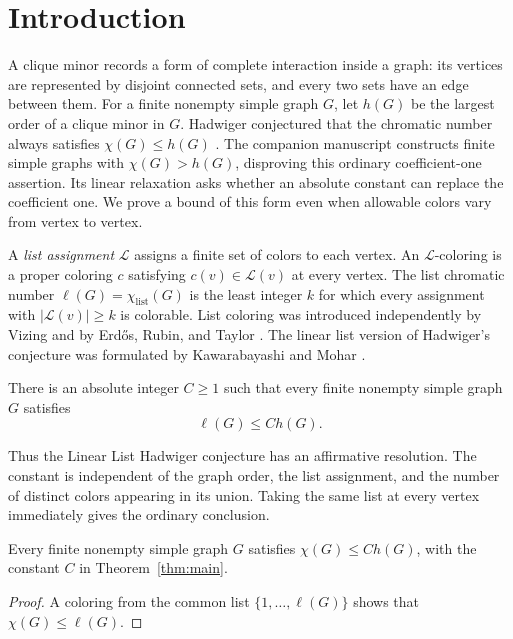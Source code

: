 \section{Introduction}\label{sec:introduction}

A clique minor records a form of complete interaction inside a graph:
its vertices are represented by disjoint connected sets, and every two
sets have an edge between them. For a finite nonempty simple graph $G$,
let $h(G)$ be the largest order of a clique minor in $G$. Hadwiger
conjectured that the chromatic number always satisfies
$\chi(G)\le h(G)$ \cite{Hadwiger1943}. The companion manuscript
\cite[Corollary~1.2]{OpenAIHadwigerCounterexample2026} constructs finite
simple graphs with $\chi(G)>h(G)$, disproving this ordinary coefficient-one
assertion. Its linear relaxation asks whether
an absolute constant can replace the coefficient one. We prove a bound
of this form even when allowable colors vary from vertex to vertex.

A \emph{list assignment} $\mathcal L$ assigns a finite set of colors to
each vertex. An $\mathcal L$-coloring is a proper coloring $c$ satisfying
$c(v)\in\mathcal L(v)$ at every vertex. The list chromatic number
$\ell(G)=\chi_{\mathrm{list}}(G)$ is the least integer $k$ for which every
assignment with $|\mathcal L(v)|\ge k$ is colorable. List coloring was
introduced independently by Vizing \cite{Vizing1976} and by Erd\H{o}s,
Rubin, and Taylor \cite{ErdosRubinTaylor1980}. The linear list
version of Hadwiger's conjecture was formulated by Kawarabayashi and
Mohar \cite[Conjecture~1.3]{KawarabayashiMohar2007}.

\begin{theorem}\label{thm:main}
There is an absolute integer $C\ge1$ such that every finite nonempty
simple graph $G$ satisfies
\[
 \ell(G)\le C h(G).
\]
\end{theorem}

Thus the Linear List Hadwiger conjecture has an affirmative resolution.
The constant is independent of the graph order, the list assignment, and
the number of distinct colors appearing in its union. Taking the same
list at every vertex immediately gives the ordinary conclusion.

\begin{corollary}\label{cor:ordinary}
Every finite nonempty simple graph $G$ satisfies $\chi(G)\le C h(G)$,
with the constant $C$ in Theorem~\ref{thm:main}.
\end{corollary}
\begin{proof}
A coloring from the common list $\{1,\ldots,\ell(G)\}$ shows that
$\chi(G)\le\ell(G)$.
\end{proof}

